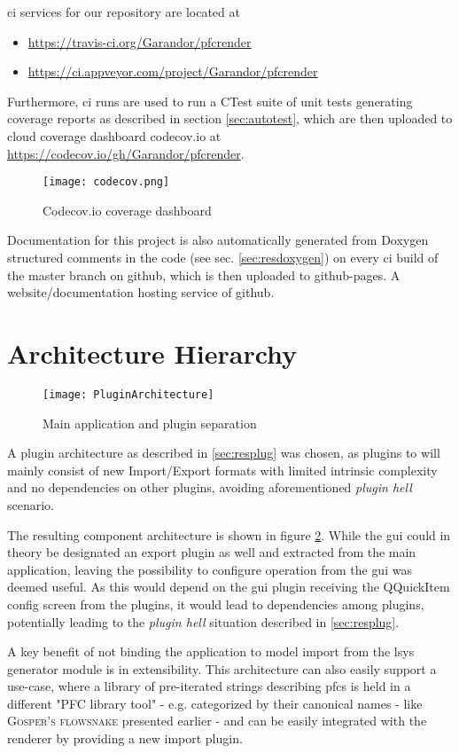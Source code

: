 \gls{ci} services for our repository are located at
\begin{itemize}
	\item \url{https://travis-ci.org/Garandor/pfcrender}
	\item \url{https://ci.appveyor.com/project/Garandor/pfcrender}
\end{itemize}

Furthermore, \gls{ci} runs are used to run a CTest suite of unit tests generating \gls{coverage} reports as described in section \ref{sec:autotest}, which are then uploaded to cloud coverage dashboard codecov.io at \url{https://codecov.io/gh/Garandor/pfcrender}.

\begin{figure}
	\texttt{[image: codecov.png]}
	\caption{Codecov.io coverage dashboard}
	\label{fig:codecov}
\end{figure}

Documentation for this project is also automatically generated from Doxygen structured comments in the code (see sec. \ref{sec:resdoxygen}) on every \gls{ci} build of the master branch on github, which is then uploaded to github-pages. A website/documentation hosting service of \gls{github}.

\section{Architecture Hierarchy}
\begin{figure}
	\texttt{[image: PluginArchitecture]}
	\caption{Main application and plugin separation}
	\label{fig:comp}
\end{figure}
A plugin architecture as described in \ref{sec:resplug} was chosen, as plugins to  will mainly consist of new Import/Export formats with limited intrinsic complexity and no dependencies on other plugins, avoiding aforementioned \textit{plugin hell} scenario.

The resulting component architecture is shown in figure \ref{fig:comp}. While the \gls{gui} could in theory be designated an export plugin as well and extracted from the main application, leaving the possibility to configure operation from the \gls{gui} was deemed useful. As this would depend on the \gls{gui} plugin receiving the QQuickItem config screen from the plugins, it would lead to dependencies among plugins, potentially leading to the \textit{plugin hell} situation described in \ref{sec:resplug}.

A key benefit of not binding the application to model import from the \gls{lsys} generator module is in extensibility. This architecture can also easily support a use-case, where a library of pre-iterated strings describing \gls{pfc}s is held in a different "PFC library tool" - e.g. categorized by their canonical names - like \textsc{Gosper's flowsnake} presented earlier - and can be easily integrated with the renderer by providing a new import plugin.
